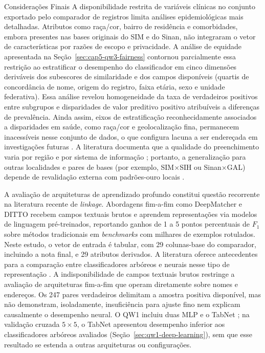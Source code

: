 \begin{chapter}{Considerações Finais}
A disponibilidade restrita de variáveis clínicas no conjunto exportado pelo comparador de registros limita análises epidemiológicas mais detalhadas. Atributos como raça/cor, bairro de residência e comorbidades, embora presentes nas bases originais do SIM e do Sinan, não integraram o vetor de características por razões de escopo e privacidade. A análise de equidade apresentada na Seção~\ref{sec:cap5-qw3-fairness} contornou parcialmente essa restrição ao estratificar o desempenho do classificador em cinco dimensões deriváveis dos subescores de similaridade e dos campos disponíveis (quartis de concordância de nome, origem do registro, faixa etária, sexo e unidade federativa). Essa análise revelou homogeneidade da taxa de verdadeiros positivos entre subgrupos e disparidades de valor preditivo positivo atribuíveis a diferenças de prevalência. Ainda assim, eixos de estratificação reconhecidamente associados a disparidades em saúde, como raça/cor e geolocalização fina, permanecem inacessíveis nesse conjunto de dados, o que configura lacuna a ser endereçada em investigações futuras \cite{Mehrabi2021fairness}. A literatura documenta que a qualidade do preenchimento varia por região e por sistema de informação \cite{Lima2020tbquality, Bartholomay2020drtb}; portanto, a generalização para outras localidades e pares de bases (por exemplo, SIM$\times$SIH ou Sinan$\times$GAL) depende de revalidação externa com padrões-ouro locais \cite{Coeli2021suboptimal}.

A avaliação de arquiteturas de aprendizado profundo constitui questão recorrente na literatura recente de \textit{linkage}. Abordagens fim-a-fim como DeepMatcher \cite{Mudgal2018deepmatcher} e DITTO \cite{Li2020ditto} recebem campos textuais brutos e aprendem representações via modelos de linguagem pré-treinados, reportando ganhos de 1 a 5 pontos percentuais de $F_1$ sobre métodos tradicionais em \textit{benchmarks} com milhares de exemplos rotulados. Neste estudo, o vetor de entrada é tabular, com 29 colunas-base do comparador, incluindo a nota final, e 29 atributos derivados. A literatura oferece antecedentes para a comparação entre classificadores arbóreos e neurais nesse tipo de representação \cite{Grinsztajn2022tabular,ShwartzZiv2022tabular}. A indisponibilidade de campos textuais brutos restringe a avaliação de arquiteturas fim-a-fim que operam diretamente sobre nomes e endereços. Os 247 pares verdadeiros delimitam a amostra positiva disponível, mas não demonstram, isoladamente, insuficiência para ajuste fino nem explicam causalmente o desempenho neural. O QW1 incluiu duas MLP e o TabNet \cite{Arik2021tabnet}; na validação cruzada $5 \times 5$, o TabNet apresentou desempenho inferior aos classificadores arbóreos avaliados (Seção~\ref{sec:qw1-deep-learning}), sem que esse resultado se estenda a outras arquiteturas ou configurações.


\end{chapter}
